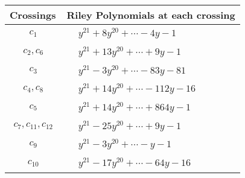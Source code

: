 \documentclass[1p]{elsarticle_modified}
\theoremstyle{definition}
\begin{document}
\begin{tabular}{m{50pt}|m{274pt}}
Crossings & \hspace{64pt}Riley Polynomials at each crossing \\
\hline $$\begin{aligned}c_{1}\end{aligned}$$&$\begin{aligned}
&y^{21}+8 y^{20}+\cdots-4 y-1
\end{aligned}$\\
\hline $$\begin{aligned}c_{2},c_{6}\end{aligned}$$&$\begin{aligned}
&y^{21}+13 y^{20}+\cdots+9 y-1
\end{aligned}$\\
\hline $$\begin{aligned}c_{3}\end{aligned}$$&$\begin{aligned}
&y^{21}-3 y^{20}+\cdots-83 y-81
\end{aligned}$\\
\hline $$\begin{aligned}c_{4},c_{8}\end{aligned}$$&$\begin{aligned}
&y^{21}+14 y^{20}+\cdots-112 y-16
\end{aligned}$\\
\hline $$\begin{aligned}c_{5}\end{aligned}$$&$\begin{aligned}
&y^{21}+14 y^{20}+\cdots+864 y-1
\end{aligned}$\\
\hline $$\begin{aligned}c_{7},c_{11},c_{12}\end{aligned}$$&$\begin{aligned}
&y^{21}-25 y^{20}+\cdots+9 y-1
\end{aligned}$\\
\hline $$\begin{aligned}c_{9}\end{aligned}$$&$\begin{aligned}
&y^{21}-3 y^{20}+\cdots- y-1
\end{aligned}$\\
\hline $$\begin{aligned}c_{10}\end{aligned}$$&$\begin{aligned}
&y^{21}-17 y^{20}+\cdots-64 y-16
\end{aligned}$\\
\hline
\end{tabular}\\~\\
\end{document}
